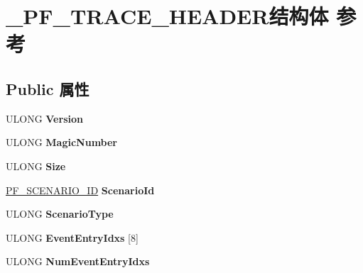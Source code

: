 \hypertarget{struct___p_f___t_r_a_c_e___h_e_a_d_e_r}{}\section{\+\_\+\+P\+F\+\_\+\+T\+R\+A\+C\+E\+\_\+\+H\+E\+A\+D\+E\+R结构体 参考}
\label{struct___p_f___t_r_a_c_e___h_e_a_d_e_r}
\subsection*{Public 属性}
\begin{DoxyCompactItemize}
\item 
\mbox{\label{struct___p_f___t_r_a_c_e___h_e_a_d_e_r_a2e52cd389e507ca1d103203eeccd8a48}} 
U\+L\+O\+NG {\bfseries Version}
\item 
\mbox{\label{struct___p_f___t_r_a_c_e___h_e_a_d_e_r_a28c0942f2d8006a3b2b4ad572afed965}} 
U\+L\+O\+NG {\bfseries Magic\+Number}
\item 
\mbox{\label{struct___p_f___t_r_a_c_e___h_e_a_d_e_r_a38c0621a55f585fe70b9eb8390c2b7c3}} 
U\+L\+O\+NG {\bfseries Size}
\item 
\mbox{\label{struct___p_f___t_r_a_c_e___h_e_a_d_e_r_ab5f59ef9d4cb0cfdabcbcfb4ef76f160}} 
\hyperlink{struct___p_f___s_c_e_n_a_r_i_o___i_d}{P\+F\+\_\+\+S\+C\+E\+N\+A\+R\+I\+O\+\_\+\+ID} {\bfseries Scenario\+Id}
\item 
\mbox{\label{struct___p_f___t_r_a_c_e___h_e_a_d_e_r_ac728afa80897e1ac9c3ebb83f64ec1b0}} 
U\+L\+O\+NG {\bfseries Scenario\+Type}
\item 
\mbox{\label{struct___p_f___t_r_a_c_e___h_e_a_d_e_r_a31a5e50e589173ada43498f709c61c61}} 
U\+L\+O\+NG {\bfseries Event\+Entry\+Idxs} \mbox{[}8\mbox{]}
\item 
\mbox{\label{struct___p_f___t_r_a_c_e___h_e_a_d_e_r_a9494f1f2a4c9ff6158c368215859d70c}} 
U\+L\+O\+NG {\bfseries Num\+Event\+Entry\+Idxs}

\end{DoxyCompactItemize}
